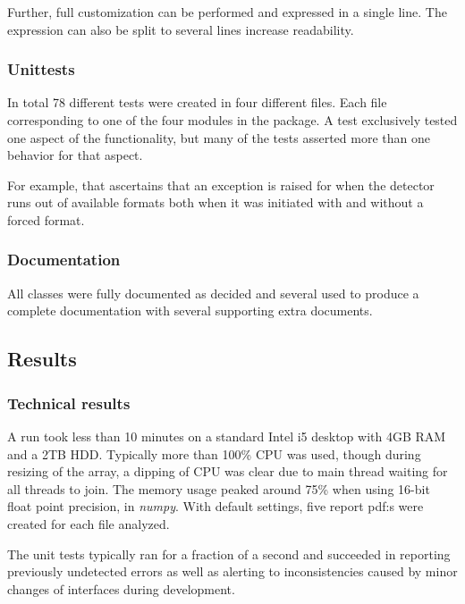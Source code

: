 \documentclass[letterpaper,10pt,english]{sphinxmanual}
\begin{document}
Further, full customization can be performed and expressed in a single line.
The expression can also be split to several lines increase readability.


\subsubsection{Unittests}
\label{c3se_python_course:unittests}
In total 78 different tests were created in four different files.
Each file corresponding to one of the four modules in the package.
A test exclusively tested one aspect of the functionality, but many of the tests
asserted more than one behavior for that aspect.

For example,  that ascertains that
an exception is raised for when the detector runs out of available formats both
when it was initiated with and without a forced format.


\subsubsection{Documentation}
\label{c3se_python_course:id8}
All classes were fully documented as decided and several  used to
produce a complete documentation with several supporting extra documents.


\subsection{Results}
\label{c3se_python_course:results}

\subsubsection{Technical results}
\label{c3se_python_course:technical-results}
A run took less than 10 minutes on a standard Intel i5 desktop with 4GB
RAM and a 2TB HDD. Typically more than 100\% CPU was used, though during
resizing of the array, a dipping of CPU was clear due to main thread waiting
for all threads to join. The memory usage peaked around 75\% when using 16-bit
float point precision, in \emph{numpy}.
With default settings, five report pdf:s were created for each file analyzed.

The unit tests typically ran for a fraction of a second and succeeded in reporting
previously undetected errors as well as alerting to inconsistencies caused by
minor changes of interfaces during development.
\end{document}
